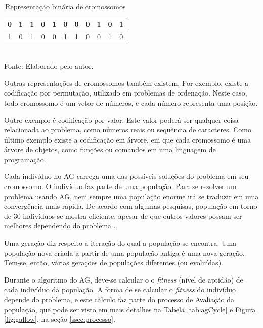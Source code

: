 \documentclass[
	12pt,					%
	openright,				%
	oneside,				%
	a4paper,				%
	bibjustif,				%
	chapter=TITLE,			%
	english,				%
	brazil,					%
	]{abntex2}
\newcommand{\source}[1]{\small Fonte: {#1}}
\begin{document}
	\begin{table}[ht]
		\caption{Representação binária de cromossomos}
		\centering
		\begin{tabular}{c c c c c c c c c c c}
			\hline 
			0 & 1 & 1 & 0 & 1 & 0 & 0 & 0 & 1 & 0 & 1\\ 
			\hline 
			1 & 0 & 1 & 0 & 0 & 1 & 1 & 0 & 0 & 1 & 0\\ 
			\hline 
		\end{tabular} \\
		\vspace{3mm}
		\source{Elaborado pelo autor.}
		\label{tab:cromosome}
	\end{table}
	
	Outras representações de cromossomos também existem.
	Por exemplo, existe a codificação por permutação,
	utilizado em problemas de ordenação.
	Neste caso, todo cromossomo é um vetor de números,
	e cada número representa uma posição.
	
	Outro exemplo é codificação por valor.
	Este valor poderá ser qualquer coisa relacionada ao problema,
	como números reais ou sequência de caracteres.
	Como último exemplo existe a codificação em árvore,
	em que cada cromossomo é uma árvore de objetos,
	como funções ou comandos em uma linguagem de programação.
	
	Cada indivíduo no AG carrega uma das possíveis soluções do problema em seu cromossomo.
	O indivíduo faz parte de uma população.
	Para se resolver um problema usando AG,
	nem sempre uma população enorme irá se traduzir em uma convergência mais rápida.
	De acordo com algumas pesquisas,
	população em torno de 30 indivíduos se mostra eficiente,
	apesar de que outros valores possam ser melhores dependendo do problema
	\cite{obitko}.
	
	Uma geração diz respeito à iteração do qual a população se encontra.
	Uma população nova criada a partir de uma população antiga é uma nova geração.
	Tem-se, então, várias gerações de populações diferentes (ou evoluídas).
	
	Durante o algoritmo do AG, deve-se calcular o o \textit{fitness} (nível de aptidão) de cada indivíduo da população.
	A forma de se calcular o \textit{fitness} do indivíduo depende do problema,
	e este cálculo faz parte do processo de Avaliação da população,
	que pode ser visto em mais detalhes na Tabela \ref{tab:agCycle} e Figura \ref{fig:gaflow},
	na seção \ref{ssec:processo}.
	
\end{document}
